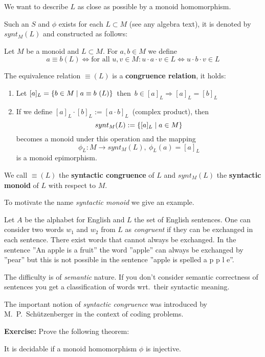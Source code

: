 We want to describe $L$ as close as possible by a monoid homomorphism.

Such an $S$ and $\phi$ exists for each $L \subset M$ (see any algebra text), it
is denoted by $synt_M(L)$ and constructed as follows:

\begin{definition}
Let $M$ be a monoid and $L \subset M$. For $a, b \in M$ we define
\[ a \equiv b (L) \iff \text{for all }u, v \in M: u \cdot a \cdot v \in L
\Leftrightarrow u \cdot b \cdot v \in L \]
\end{definition}

The equivalence relation $\equiv (L)$ is a {\bf congruence relation}, it holds:
\begin{enumerate}
  \item Let $[a]_L = \mbox{$\{ b \in M \mid a \equiv b\ (L) \}$}$\ then\ $b \in
  [a]_L \Rightarrow [a]_L = [b]_L $
  \item If we define $[a]_L \cdot [b]_L := [a \cdot b]_L$\ (complex product),
  then \[synt_M(L) := \mbox{$\{[a]_L \mid a \in M\}$} \] becomes a monoid under
  this operation and the mapping \[\phi_L : M \to synt_M(L),\ \phi_L(a) = [a]_L\]
   is a monoid epimorphism.
\end{enumerate}

We call $\equiv (L)$ the {\bf syntactic congruence} of $L$ and $synt_M(L)$ the
{\bf syntactic monoid} of $L$ with respect to $M$.

To motivate the name {\em syntactic monoid} we give an example.

Let $A$ be the alphabet for English and $L$ the set of English sentences.
One can consider two words $w_1$ and $w_2$ from $L$ as {\em congruent} if they
can be exchanged in each sentence. There exist words that cannot always be exchanged. 
In the sentence ''An apple is a fruit'' the word ''apple'' can always be
exchanged by ''pear'' but this is not possible in the sentence ''apple is
spelled a p p l e''.

The difficulty is of {\em semantic} nature. If you don't consider semantic
correctness of sentences you get a classification of words wrt.\ their syntactic
meaning.

The important notion of {\em syntactic congruence} was introduced by M.\
P.\ Schützen\-berger in the context of coding problems.

{\bf Exercise:} Prove the following theorem:
\begin{theorem}
It is decidable if a monoid homomorphism $\phi$ is injective.
\end{theorem}


